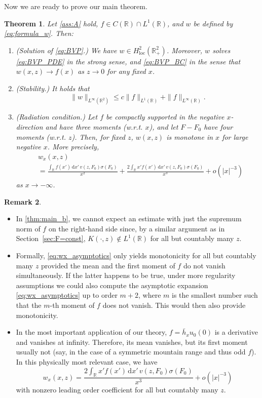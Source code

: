 \documentclass[11pt,twoside,reqno,centertags]{amsart}
\newtheorem{theorem}{Theorem}
\theoremstyle{definition}
\newtheorem{remark}[theorem]{Remark}
\newcommand{\R}{\mathbb R}
\newcommand{\dd}{\mathrm d}
\begin{document}
Now we are ready to prove our main theorem.
\begin{theorem}\label{thm:main}
	Let \eqref{ass:A} hold, $f\in C(\R)\cap L^1(\R)$, and $w$ be defined by \eqref{eq:formula_w}. Then:
	\begin{enumerate}[label=(\alph*)]
		\item\label{thm:main_a} (Solution of \eqref{eq:BVP}.) We have $w\in H^2_{\mathrm{loc}}(\R^2_+)$. Moreover, $w$ solves \eqref{eq:BVP_PDE} in the strong sense, and \eqref{eq:BVP_BC} in the sense that $w(x,z)\to f(x)$ as $z\to0$ for any fixed $x$.
		\item\label{thm:main_b} (Stability.) It holds that
		\[\|w\|_{L^\infty(\R^2)} \le c\|f\|_{L^1(\R)} + \|f\|_{L^\infty(\R)}.\]
		\item\label{thm:main_c} (Radiation condition.) Let $f$ be compactly supported in the negative $x$-direction and have three moments (w.r.t. $x$), and let $F-F_0$ have four moments (w.r.t. $z$). Then, for fixed $z$, $w(x,z)$ is monotone in $x$ for large negative $x$. More precisely,
		\begin{align}
			&w_x(x,z)\nonumber\\
			&= \frac{\int_\R f(x')\,\dd x'\, v(z,F_0) \sigma(F_0)}{x^2} + \frac{2\int_\R x'f(x')\,\dd x'\,v(z,F_0) \sigma(F_0)}{x^3} + o(|x|^{-3})\label{eq:wx_asymptotics}
		\end{align}
		as $x\to-\infty$.
	\end{enumerate}
\end{theorem}

\begin{remark}
	\begin{itemize}
		\item In \ref{thm:main_b}, we cannot expect an estimate with just the supremum norm of $f$ on the right-hand side since, by a similar argument as in Section~\ref{sec:F=const}, $K(\cdot,z)\notin L^1(\R)$ for all but countably many $z$.
		\item Formally, \eqref{eq:wx_asymptotics} only yields monotonicity for all but countably many $z$  provided the mean and the first moment of $f$ do not vanish simultaneously. If the latter happens to be true, under more regularity assumptions we could also compute the asymptotic expansion \eqref{eq:wx_asymptotics} up to order $m+2$, where $m$ is the smallest number such that the $m$-th moment of $f$ does not vanish. This would then also provide monotonicity.
		\item In the most important application of our theory, $f=\bar h_x u_0(0)$ is a derivative and vanishes at infinity. Therefore, its mean vanishes, but its first moment usually not (say, in the case of a symmetric mountain range and thus odd $f$). In this physically most relevant case, we have
		\[w_x(x,z) = \frac{2\int_\R x'f(x')\,\dd x'\,v(z,F_0) \sigma(F_0)}{x^3} + o(|x|^{-3})\]
		with nonzero leading order coefficient for all but countably many $z$.
	\end{itemize}
\end{remark}
\end{document}
